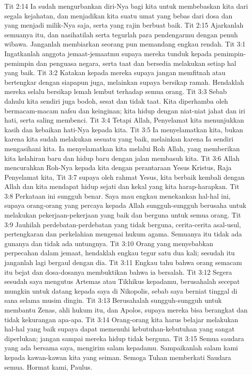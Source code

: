 Tit 2:14  Ia sudah mengurbankan diri-Nya bagi kita untuk membebaskan kita dari segala kejahatan, dan menjadikan kita suatu umat yang bebas dari dosa dan yang menjadi milik-Nya saja, serta yang rajin berbuat baik.
Tit 2:15  Ajarkanlah semuanya itu, dan nasihatilah serta tegurlah para pendengarmu dengan penuh wibawa. Janganlah membiarkan seorang pun memandang engkau rendah.
Tit 3:1  Ingatkanlah anggota jemaat-jemaatmu supaya mereka tunduk kepada pemimpin-pemimpin dan penguasa negara, serta taat dan bersedia melakukan setiap hal yang baik.
Tit 3:2  Katakan kepada mereka supaya jangan memfitnah atau bertengkar dengan siapapun juga, melainkan supaya bersikap ramah. Hendaklah mereka selalu bersikap lemah lembut terhadap semua orang.
Tit 3:3  Sebab dahulu kita sendiri juga bodoh, sesat dan tidak taat. Kita diperhamba oleh bermacam-macam nafsu dan keinginan; kita hidup dengan niat-niat jahat dan iri hati, serta saling membenci.
Tit 3:4  Tetapi Allah, Penyelamat kita menunjukkan kasih dan kebaikan hati-Nya kepada kita.
Tit 3:5  Ia menyelamatkan kita, bukan karena kita sudah melakukan sesuatu yang baik, melainkan karena Ia sendiri mengasihani kita. Ia menyelamatkan kita melalui Roh Allah, yang memberikan kita kelahiran baru dan hidup baru dengan jalan membasuh kita.
Tit 3:6  Allah mencurahkan Roh-Nya kepada kita dengan perantaraan Yesus Kristus, Raja Penyelamat kita,
Tit 3:7  supaya oleh rahmat Yesus, kita berbaik kembali dengan Allah dan kita mendapat hidup sejati dan kekal yang kita harap-harapkan.
Tit 3:8  Perkataan ini sungguh benar. Saya mau engkau menekankan hal-hal ini, supaya orang-orang yang percaya kepada Allah sungguh-sungguh berusaha untuk melakukan pekerjaan-pekerjaan yang baik dan berguna untuk semua orang.
Tit 3:9  Jauhilah perdebatan-perdebatan yang tidak berguna, cerita-cerita asal-usul, pertengkaran dan perkelahian mengenai hukum agama. Semuanya itu tidak ada gunanya dan tidak ada untungnya.
Tit 3:10  Orang yang menyebabkan perpecahan dalam jemaat, hendaklah engkau tegur satu dua kali; sesudah itu janganlah lagi bergaul dengan dia.
Tit 3:11  Engkau tahu bahwa orang semacam itu bejat dan dosa-dosanya membuktikan bahwa ia bersalah.
Tit 3:12  Segera sesudah saya mengutus Artemas atau Tikhikus kepadamu, berusahalah secepat mungkin untuk datang kepada saya di Nikopolis, sebab saya berniat tinggal di sana selama musim dingin.
Tit 3:13  Berusahalah sungguh-sungguh untuk membantu Zenas, ahli hukum itu, dan Apolos, supaya mereka bisa berangkat dan tidak kekurangan apa-apa.
Tit 3:14  Orang-orang kita harus belajar melakukan hal-hal yang baik supaya dapat memenuhi kebutuhan-kebutuhan yang sangat diperlukan; jangan sampai mereka hidup tidak berguna.
Tit 3:15  Semua saudara yang ada bersama saya, mengirim salam kepadamu. Sampaikanlah salam kami kepada kawan-kawan kita yang seiman. Semoga Tuhan memberkati Saudara semua. Hormat kami, Paulus.


